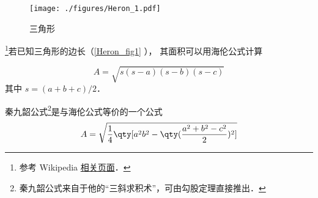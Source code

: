 \begin{figure}[ht]
\centering
\texttt{[image: ./figures/Heron\_1.pdf]}
\caption{三角形} \label{Heron_fig1}
\end{figure}
\footnote{参考 Wikipedia \href{https://en.wikipedia.org/wiki/Heron's_formula}{相关页面}．}若已知三角形的边长（\autoref{Heron_fig1} ）， 其面积可以用海伦公式计算


\begin{equation}\label{Heron_eq1}
A = \sqrt{s(s-a)(s-b)(s-c)}
\end{equation}
其中 $s = (a+b+c)/2$．

秦九韶公式\footnote{秦九韶公式来自于他的“三斜求积术”，可由勾股定理直接推出．}是与海伦公式等价的一个公式
\begin{equation}
A = \sqrt{\frac{1}{4}\qty[a^2b^2-\qty(\frac{a^2+b^2-c^2}{2})^2]}
\end{equation}


